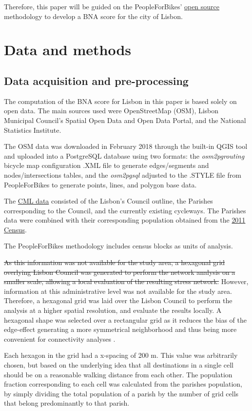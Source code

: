 \documentclass[information,article,submit,moreauthors,Latex,dvi2pdf,10pt,a4paper]{Definitions/mdpi}
\begin{document}
Therefore, this paper will be guided on the  PeopleForBikes’ \href{https://github.com/azavea/pfb-network-connectivity}{open source} methodology to develop a BNA score for the city of Lisbon.

\section{Data and methods} \label {methods}

\subsection{Data acquisition and pre-processing} \label{data}

The computation of the BNA score for Lisbon in this paper is based solely on open data. The main sources used were OpenStreetMap (OSM), Lisbon Municipal Council's Spatial Open Data and Open Data Portal, and the National Statistics Institute. 

The OSM data was downloaded in February 2018 through the built-in QGIS tool and uploaded into a PostgreSQL database using two formats: the \textit{osm2pgrouting} bicycle map
configuration .XML file to generate edges/segments and nodes/intersections tables, and the \textit{osm2pgsql} adjusted to the .STYLE file from PeopleForBikes to generate points, lines, and polygon base data. 

The \href{http://geodados.cm-lisboa.pt/}{CML data} consisted of the Lisbon's Council outline, the Parishes corresponding to the Council, and the currently existing cycleways. The Parishes data were combined with their corresponding population obtained from the \href{http://censos.ine.pt/}{2011 Census}. 

The PeopleForBikes methodology includes census blocks as units of analysis. 
\begin{mycolorbox}[colback=yellow]
\sout{As this information was not available for the study area, a hexagonal grid overlying Lisbon Council was generated to perform the network analysis on a smaller scale, allowing a local evaluation of the resulting stress network.} However, information at this administrative level was not available for the study area. Therefore, a hexagonal grid was laid over the Lisbon Council to perform the analysis at a higher spatial resolution, and evaluate the results locally. A hexagonal shape was selected over a rectangular grid as it reduces the bias of the edge-effect generating a more symmetrical neighborhood and thus being more convenient for connectivity analyses \cite{Birch2007}.
\end{mycolorbox} 
Each hexagon in the grid had a x-spacing of 200 m. This value was arbitrarily chosen, but based on the underlying idea that all destinations in a single cell should be on a reasonable walking distance from each other. The population fraction corresponding to each cell was calculated from the parishes population, by simply dividing the total population of a parish by the number of grid cells that belong predominantly to that parish.
\end{document}
